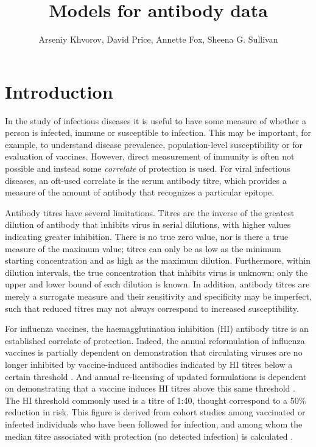 \documentclass[12pt]{article}
\title{Models for antibody data}
\author{Arseniy Khvorov, David Price, Annette Fox, Sheena G. Sullivan}
\begin{document}
\maketitle


\section{Introduction}

In the study of infectious diseases it is useful to have some measure of whether a person is infected, immune or susceptible to infection. This may be important, for example, to understand disease prevalence, population-level susceptibility or for evaluation of vaccines.  However, direct measurement of immunity is often not possible and instead some \textit{correlate} of protection is used. For viral infectious diseases, an oft-used correlate is the serum antibody titre, which provides a measure of the amount of antibody that recognizes a particular epitope. 

Antibody titres have several limitations. Titres are the inverse of the greatest dilution of antibody that inhibits virus in serial dilutions, with higher values indicating greater inhibition. There is no true zero value, nor is there a true measure of the maximum value; titres can only be as low as the minimum starting concentration and as high as the maximum dilution.  Furthermore, within dilution intervals, the true concentration that inhibits virus is unknown; only the upper and lower bound of each dilution is known. In addition, antibody titres are merely a surrogate measure and their sensitivity and specificity may be imperfect, such that reduced titres may not always correspond to increased susceptibility. 

For influenza vaccines, the haemagglutination inhibition (HI) antibody titre is an established correlate of protection. Indeed, the annual reformulation of influenza vaccines is partially dependent on demonstration that circulating viruses are no longer inhibited by vaccine-induced antibodies indicated by HI titres below a certain threshold \citep{Barr;2014}. And annual re-licensing of updated formulations is dependent on demonstrating that a vaccine induces HI titres above this same threshold \citep{Wood;2003}.  The HI threshold commonly used is a titre of 1:40, thought correspond to a 50\% reduction in risk. This figure is derived from cohort studies among vaccinated or infected individuals who have been followed for infection, and among whom the median titre associated with protection (no detected infection) is calculated \citep{Hobson;1972}\citep{Ng;2013}. 
\end{document}

